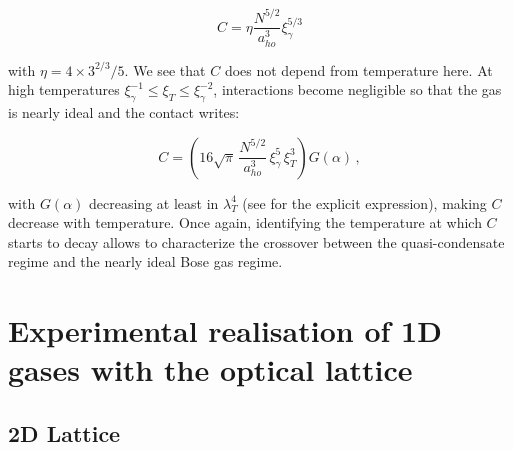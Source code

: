 \begin{equation}
    C = \eta \frac{N^{5/2}}{a_{ho}^3} \xi_\gamma^{5/3} 
    \label{eq:weak_int_lowT}
\end{equation}

\noindent with $\eta = 4 \times 3^{2/3}/5$. We see that $C$ does not depend from temperature here. At high temperatures $\xi_\gamma^{-1} \leq \xi_T \leq \xi_\gamma^{-2}$, interactions become negligible so that the gas is nearly ideal and the contact writes:

\begin{equation}
    C = \left( 16 \sqrt{\pi} \, \frac{N^{5/2}}{a_{ho}^3} \, \xi_\gamma^5 \, \xi_T^3 \right) G(\alpha) \, ,
    \label{eq:weak_int_highT}
\end{equation}

\noindent with $G(\alpha)$ decreasing at least in $\lambda_T^4$ (see \cite{yao2018tan} for the explicit expression), making $C$ decrease with temperature. Once again, identifying the temperature at which $C$ starts to decay allows to characterize the crossover between the quasi-condensate regime and the nearly ideal Bose gas regime.

\section{Experimental realisation of 1D gases with the optical lattice}

\label{sec:1D_exp}

\subsection{2D Lattice}


